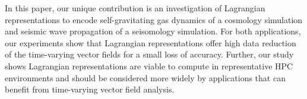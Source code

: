 %
%
%
%
%

In this paper, our unique contribution is an investigation of Lagrangian representations to encode self-gravitating gas dynamics of a cosmology simulation and seismic wave propagation of a seisomology simulation.
%
%
%
%
%
For both applications, our experiments show that Lagrangian representations offer high data reduction of the time-varying vector fields for a small loss of accuracy. 
%
Further, our study shows Lagrangian representations are viable to compute in representative HPC environments and should be considered more widely by applications that can benefit from time-varying vector field analysis.
